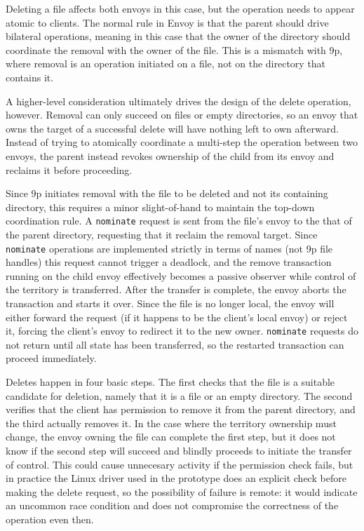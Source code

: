 Deleting a file affects both envoys in this case, but the operation needs to appear atomic to clients. The normal rule in Envoy is that the parent should drive bilateral operations, meaning in this case that the owner of the directory should coordinate the removal with the owner of the file. This is a mismatch with 9p, where removal is an operation initiated on a file, not on the directory that contains it.

A higher-level consideration ultimately drives the design of the delete operation, however. Removal can only succeed on files or empty directories, so an envoy that owns the target of a successful delete will have nothing left to own afterward. Instead of trying to atomically coordinate a multi-step the operation between two envoys, the parent instead revokes ownership of the child from its envoy and reclaims it before proceeding.

Since 9p initiates removal with the file to be deleted and not its containing directory, this requires a minor slight-of-hand to maintain the top-down coordination rule. A \texttt{nominate} request is sent from the file's envoy to the that of the parent directory, requesting that it reclaim the removal target. Since \texttt{nominate} operations are implemented strictly in terms of names (not 9p file handles) this request cannot trigger a deadlock, and the remove transaction running on the child envoy effectively becomes a passive observer while control of the territory is transferred. After the transfer is complete, the envoy aborts the transaction and starts it over. Since the file is no longer local, the envoy will either forward the request (if it happens to be the client's local envoy) or reject it, forcing the client's envoy to redirect it to the new owner. \texttt{nominate} requests do not return until all state has been transferred, so the restarted transaction can proceed immediately.

Deletes happen in four basic steps. The first checks that the file is a suitable candidate for deletion, namely that it is a file or an empty directory. The second verifies that the client has permission to remove it from the parent directory, and the third actually removes it. In the case where the territory ownership must change, the envoy owning the file can complete the first step, but it does not know if the second step will succeed and blindly proceeds to initiate the transfer of control. This could cause unnecesary activity if the permission check fails, but in practice the Linux driver used in the prototype does an explicit check before making the delete request, so the possibility of failure is remote: it would indicate an uncommon race condition and does not compromise the correctness of the operation even then.

